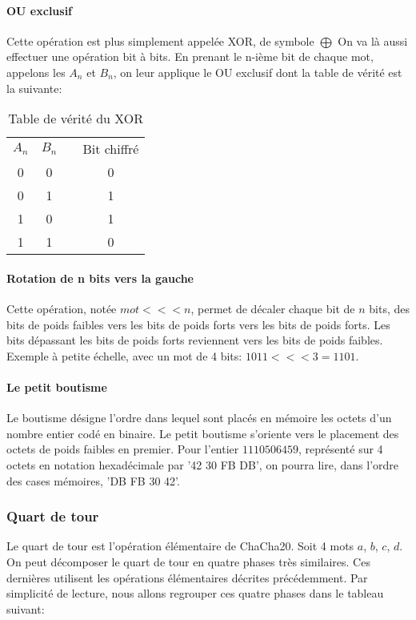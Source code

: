\paragraph{OU exclusif} \label{xor}
Cette opération est plus simplement appelée XOR, de symbole $\bigoplus$
On va là aussi effectuer une opération bit à bits. En prenant le n-ième bit de chaque mot, appelons les $A_n$ et $B_n$, on leur applique le OU exclusif dont la table de vérité est la suivante:

\begin{table}[H]
    \centering
    \begin{tabular}{cccc}
        $A_n$ & $B_n$ && Bit chiffré \\
        0 & 0 && 0 \\
        0 & 1 && 1 \\
        1 & 0 && 1 \\
        1 & 1 && 0 \\
    \end{tabular}
    \caption{Table de vérité du XOR}
\end{table}

\paragraph{Rotation de n bits vers la gauche}
Cette opération, notée $mot<<<n$, permet de décaler chaque bit de $n$ bits, des bits de poids faibles vers les bits de poids forts vers les bits de poids forts. Les bits dépassant les bits de poids forts reviennent vers les bits de poids faibles. Exemple à petite échelle, avec un mot de 4 bits: $1011<<<3=1101$.

\paragraph{Le petit boutisme} \label{boutisme} 
Le boutisme désigne l'ordre dans lequel sont placés en mémoire les octets d'un nombre entier codé en binaire. Le petit boutisme s'oriente vers le placement des octets de poids faibles en premier. Pour l'entier $1110506459$, représenté sur 4 octets en notation hexadécimale par '42 30 FB DB', on pourra lire, dans l'ordre des cases mémoires, 'DB FB 30 42'. \cite{noauthor_definition_nodate}

\subsubsection{Quart de tour}
Le quart de tour est l'opération élémentaire de {\ttfamily ChaCha20}. Soit 4 mots $a$, $b$, $c$, $d$. On peut décomposer le quart de tour en quatre phases très similaires. Ces dernières utilisent les opérations élémentaires décrites précédemment. Par simplicité de lecture, nous allons regrouper ces quatre phases dans le tableau suivant:


